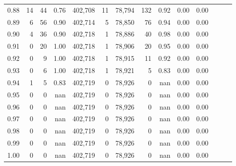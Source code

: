\begin{tabular}{rrrrrrrrrrrrrr}
0.88 &      14 &     44 &  0.76 &  402,708 &       11 &  78,794 &     132 &  0.92 &  0.00 &      0.00 \\
0.89 &       6 &     56 &  0.90 &  402,714 &        5 &  78,850 &      76 &  0.94 &  0.00 &      0.00 \\
0.90 &       4 &     36 &  0.90 &  402,718 &        1 &  78,886 &      40 &  0.98 &  0.00 &      0.00 \\
0.91 &       0 &     20 &  1.00 &  402,718 &        1 &  78,906 &      20 &  0.95 &  0.00 &      0.00 \\
0.92 &       0 &      9 &  1.00 &  402,718 &        1 &  78,915 &      11 &  0.92 &  0.00 &      0.00 \\
0.93 &       0 &      6 &  1.00 &  402,718 &        1 &  78,921 &       5 &  0.83 &  0.00 &      0.00 \\
0.94 &       1 &      5 &  0.83 &  402,719 &        0 &  78,926 &       0 &   nan &  0.00 &      0.00 \\
0.95 &       0 &      0 &   nan &  402,719 &        0 &  78,926 &       0 &   nan &  0.00 &      0.00 \\
0.96 &       0 &      0 &   nan &  402,719 &        0 &  78,926 &       0 &   nan &  0.00 &      0.00 \\
0.97 &       0 &      0 &   nan &  402,719 &        0 &  78,926 &       0 &   nan &  0.00 &      0.00 \\
0.98 &       0 &      0 &   nan &  402,719 &        0 &  78,926 &       0 &   nan &  0.00 &      0.00 \\
0.99 &       0 &      0 &   nan &  402,719 &        0 &  78,926 &       0 &   nan &  0.00 &      0.00 \\
1.00 &       0 &      0 &   nan &  402,719 &        0 &  78,926 &       0 &   nan &  0.00 &      0.00 \\
\bottomrule
\end{tabular}
